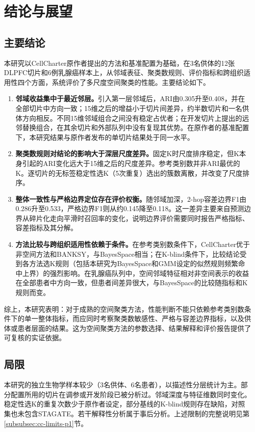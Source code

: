 \section{结论与展望}
\label{sec:cc-conclusion-p1}

\subsection{主要结论}
本研究以CellCharter原作者提出的方法和基准配置为基础，在3名供体的12张DLPFC切片和6例乳腺癌样本上，从邻域表征、聚类数规则、评价指标和跨组织适用性四个方面，系统评价了多尺度空间聚类的性能。主要结论如下。

\begin{enumerate}
  \item \textbf{邻域收益集中于最近邻层。}引入第一层邻域后，ARI由0.305升至0.408，并在全部切片中方向一致；15维之后的增益小于切片间差异，约半数切片和一名供体方向相反。不同15维邻域组合之间没有稳定占优者；在开发切片上提出的远邻替换组合，在其余切片和外部队列中没有复现其优势。在原作者的基准配置下，本研究结果与原作者发布的单切片结果处于同一水平。
  \item \textbf{聚类数规则对结论的影响大于深层尺度差异。}固定K时尺度排序稳定，但K本身引起的ARI变化远大于15维之后的尺度差异。参考类别数并非ARI最优的K。逐切片的无标签稳定性选K（5次重复）选出的簇数离散，并改变了尺度排序。
  \item \textbf{整体一致性与严格边界定位存在评价权衡。}随邻域加深，2-hop容差边界F1由0.286升至0.533，严格边界F1则从约0.145降至0.118。这一差异主要来自预测边界从碎片化走向平滑时召回率的变化，说明边界评价需要同时报告严格指标、容差指标及其分解。
  \item \textbf{方法比较与跨组织适用性依赖于条件。}在参考类别数条件下，CellCharter优于非空间方法和BANKSY，与BayesSpace相当；在K-blind条件下，比较结论受到各方法选K规则（包括本研究为BayesSpace和GMM设定的似然规则频繁命中上界）的强烈影响。在乳腺癌队列中，空间邻域特征相对非空间表示的收益在全部患者中方向一致，但患者间差异很大，与BayesSpace的比较随指标和K规则而变。
\end{enumerate}

综上，本研究表明：对于成熟的空间聚类方法，性能判断不能只依赖参考类别数条件下的单一整体指标，而应同时考察聚类数敏感性、严格与容差边界指标，以及供体或患者层面的结果。这为空间聚类方法的参数选择、结果解释和评价报告提供了可复核的实证依据。

\subsection{局限}
本研究的独立生物学样本较少（3名供体、6名患者），以描述性分层统计为主。部分配置所用的切片在调参或开发阶段已被分析过。邻域深度与特征维数同时变化。稳定性选K的重复次数少于原作者设定，部分基线的K-blind规则存在缺陷，对照集也未包含STAGATE。若干解释性分析属于事后分析。上述限制的完整说明见第\ref{subsubsec:cc-limits-p1}节。

